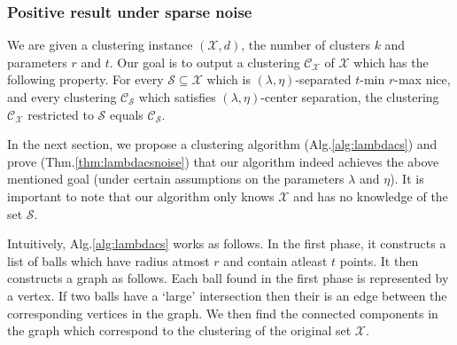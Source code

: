\documentclass[anon,12pt]{colt2016} %
\newcommand{\mc}{\mathcal}
\begin{document}
\subsubsection{Positive result under sparse noise}
\label{section:lambdaPositiveResultSparseNoise}
We are given a clustering instance $(\mc X, d)$, the number of clusters $k$ and parameters $r$ and $t$. Our goal is to output a clustering $\mc C_{\mc X}$ of $\mc X$ which has the following property. For every $\mc S \subseteq \mc X$ which is $(\lambda, \eta)$-separated $t$-min $r$-max nice, and every clustering $\mc C_{\mc S}$ which satisfies $(\lambda, \eta)$-center separation, the clustering $\mc C_{\mc X}$ restricted to $\mc S$ equals $\mc C_{\mc S}$. 

In the next section, we propose a clustering algorithm (Alg.\ref{alg:lambdacs}) and prove (Thm.\ref{thm:lambdacsnoise}) that our algorithm indeed achieves the above mentioned goal (under certain assumptions on the parameters $\lambda$ and $\eta$). It is important to note that our algorithm only knows $\mc X$ and has no knowledge of the set $\mc S$. 

Intuitively, Alg.\ref{alg:lambdacs} works as follows. In the first phase, it constructs a list of balls which have radius atmost $r$ and contain atleast $t$ points. It then constructs a graph as follows. Each ball found in the first phase is represented by a vertex. If two balls have a `large' intersection then their is an edge between the corresponding vertices in the graph. We then find the connected components in the graph which correspond to the clustering of the original set $\mc X$. 
\end{document}
